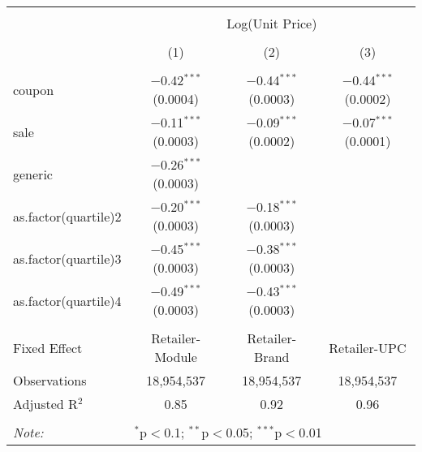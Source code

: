 
\begin{table}[!htbp] \centering 
  \caption{} 
  \label{tab:overallSavingsNonStorable} 
\begin{tabular}{@{\extracolsep{5pt}}lccc} 
\\[-1.8ex]\hline 
\hline \\[-1.8ex] 
 & \multicolumn{3}{c}{Log(Unit Price)} \\ 
\\[-1.8ex] & (1) & (2) & (3)\\ 
\hline \\[-1.8ex] 
 coupon & $-$0.42$^{***}$ (0.0004) & $-$0.44$^{***}$ (0.0003) & $-$0.44$^{***}$ (0.0002) \\ 
  sale & $-$0.11$^{***}$ (0.0003) & $-$0.09$^{***}$ (0.0002) & $-$0.07$^{***}$ (0.0001) \\ 
  generic & $-$0.26$^{***}$ (0.0003) &  &  \\ 
  as.factor(quartile)2 & $-$0.20$^{***}$ (0.0003) & $-$0.18$^{***}$ (0.0003) &  \\ 
  as.factor(quartile)3 & $-$0.45$^{***}$ (0.0003) & $-$0.38$^{***}$ (0.0003) &  \\ 
  as.factor(quartile)4 & $-$0.49$^{***}$ (0.0003) & $-$0.43$^{***}$ (0.0003) &  \\ 
 \hline \\[-1.8ex] 
Fixed Effect & Retailer-Module & Retailer-Brand & Retailer-UPC \\ 
Observations & 18,954,537 & 18,954,537 & 18,954,537 \\ 
Adjusted R$^{2}$ & 0.85 & 0.92 & 0.96 \\ 
\hline 
\hline \\[-1.8ex] 
\textit{Note:}  & \multicolumn{3}{l}{$^{*}$p$<$0.1; $^{**}$p$<$0.05; $^{***}$p$<$0.01} \\ 
\end{tabular} 
\end{table} 
